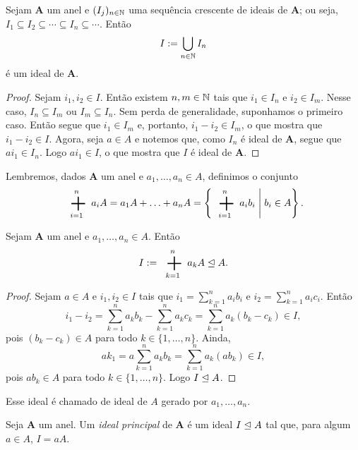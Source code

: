 \begin{proposition}
	Sejam $\bm A$ um anel e $(I_j)_{n \in \mathbb{N}}$ uma sequência crescente de ideais de $\bm A$; ou seja, $I_1 \subseteq I_2 \subseteq \cdots \subseteq I_n \subseteq \cdots$. Então
	\begin{equation*}
	I := \bigcup_{n \in \mathbb{N}} I_n
	\end{equation*}
é um ideal de $\bm A$.
\end{proposition}
\begin{proof}
	Sejam $i_1,i_2 \in I$. Então existem $n,m \in \mathbb{N}$ tais que $i_1 \in I_n$ e $i_2 \in I_m$. Nesse caso, $I_n \subseteq I_m$ ou $I_m \subseteq I_n$. Sem perda de generalidade, suponhamos o primeiro caso. Então segue que $i_1 \in I_m$ e, portanto, $i_1-i_2 \in I_m$, o que mostra que $i_1-i_2 \in I$. Agora, seja $a \in A$ e notemos que, como $I_n$ é ideal de $\bm A$, segue que $ai_1 \in I_n$. Logo $ai_1 \in I$, o que mostra que $I$ é ideal de $\bm A$.
\end{proof}

Lembremos, dados $\bm A$ um anel e $a_1,\ldots,a_n \in A$, definimos o conjunto
	\begin{equation*}
	\sum_{i=1}^n a_iA = a_1A + \ldots + a_nA = \set{\sum_{i=1}^n a_ib_i}{b_i \in A}.
	\end{equation*}

\begin{proposition}
Sejam $\bm A$ um anel e $a_1,\ldots,a_n \in A$. Então
	\begin{equation*}
	I := \sum_{k=1}^n a_kA \ide A.
	\end{equation*}
\end{proposition}
\begin{proof}
	Sejam $a \in A$ e $i_1,i_2 \in I$ tais que $i_1=\sum_{k=1}^n a_ib_i$ e $i_2=\sum_{k=1}^n a_ic_i$. Então
	\begin{equation*}
	i_1-i_2=\sum_{k=1}^n a_kb_k - \sum_{k=1}^n a_kc_k = \sum_{k=1}^n a_k(b_k-c_k) \in I,
	\end{equation*}
pois $(b_k-c_k) \in A$ para todo $k \in \{1,\ldots,n\}$. Ainda,
	\begin{equation*}
	ak_1=a\sum_{k=1}^n a_kb_k= \sum_{k=1}^n a_k(ab_k) \in I,
	\end{equation*}
pois $ab_k \in A$ para todo $k \in \{1,\ldots,n\}$. Logo $I \mathrel{\unlhd} A$.
\end{proof}

Esse ideal é chamado de ideal de $A$ gerado por $a_1,\ldots,a_n$.

\begin{definition}
Seja $\bm A$ um anel. Um \emph{ideal principal} de $\bm A$ é um ideal $I \mathrel{\unlhd} A$ tal que, para algum $a \in A$, $I=aA$.
\end{definition}


